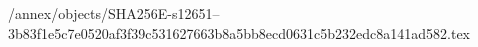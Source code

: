 /annex/objects/SHA256E-s12651--3b83f1e5c7e0520af3f39c531627663b8a5bb8ecd0631c5b232edc8a141ad582.tex
